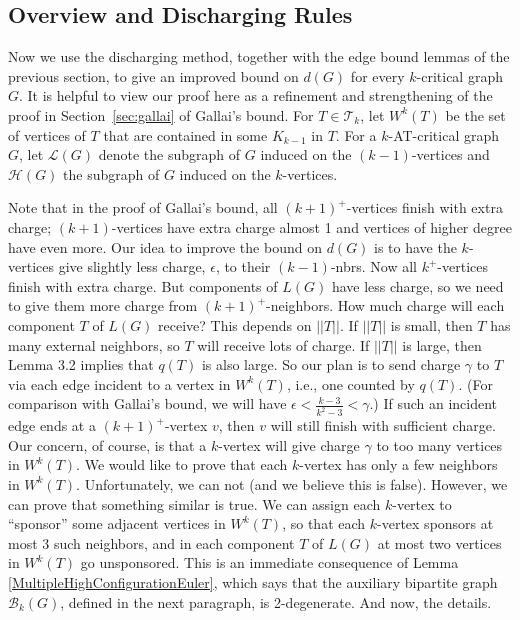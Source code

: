 \documentclass[12pt]{article}
\theoremstyle{plain}
\theoremstyle{definition}
\theoremstyle{remark}
\newcommand{\fancy}[1]{\mathcal{#1}}
\newcommand{\T}{\fancy{T}}
\newcommand{\B}{\fancy{B}}
\renewcommand{\L}{\fancy{L}}
\newcommand{\HH}{\fancy{H}}
\begin{document}
\subsection{Overview and Discharging Rules}

Now we use the discharging method, together with the edge bound lemmas of the previous section, to give an improved bound on $d(G)$ 
for every $k$-critical graph $G$.  It is helpful to view our proof here as a refinement and strengthening of the proof in
Section~\ref{sec:gallai} of Gallai's bound.  For $T \in \T_k$, let $W^k(T)$ be the set of vertices of $T$ that are contained in 
some $K_{k-1}$ in $T$.  For a $k$-AT-critical graph $G$, let $\L(G)$ denote the subgraph of $G$ induced on the $(k-1)$-vertices and 
$\HH(G)$ the subgraph of $G$ induced on the $k$-vertices.     

Note that in the proof of Gallai's bound, all $(k+1)^+$-vertices finish with extra charge; $(k+1)$-vertices have extra
charge almost 1 and vertices of higher degree have even more.  Our idea to improve the bound on $d(G)$ is to have the 
$k$-vertices give slightly less charge, $\epsilon$, to their $(k-1)$-nbrs.  Now all $k^+$-vertices finish with extra charge.  
But components of $L(G)$ have less charge, so we need to give them more charge from $(k+1)^+$-neighbors.  
How much charge will each component $T$ of $L(G)$ receive? This depends on $||T||$.  If $||T||$ is small, then $T$ has many 
external neighbors, so $T$ will receive lots of charge.  If $||T||$ is large, then Lemma 3.2 implies that $q(T)$ is also large.  
So our plan is to send charge $\gamma$ to $T$ via each edge incident to a vertex in $W^k(T)$, i.e., one counted by 
$q(T)$.  (For comparison with Gallai's bound, we will have $\epsilon < \frac{k-3}{k^2-3} < \gamma$.)  If such an incident edge 
ends at a $(k+1)^+$-vertex $v$, then $v$ will still finish with sufficient charge.  Our concern, of course, is that a
$k$-vertex will give charge $\gamma$ to too many vertices in $W^k(T)$.  We would like to prove that each $k$-vertex has only a 
few neighbors in $W^k(T)$.  Unfortunately, we can not (and we believe this is false). However, we can prove that something similar 
is true.  We can assign each $k$-vertex to ``sponsor'' some adjacent vertices in $W^k(T)$, so that each $k$-vertex sponsors at 
most 3 such neighbors, and in each component $T$ of $L(G)$ at most two vertices in $W^k(T)$ go unsponsored.  This is an immediate
consequence of Lemma \ref{MultipleHighConfigurationEuler}, which says that the auxiliary bipartite graph $\B_k(G)$, defined in 
the next paragraph, is 2-degenerate.  And now, the details.
\end{document}
